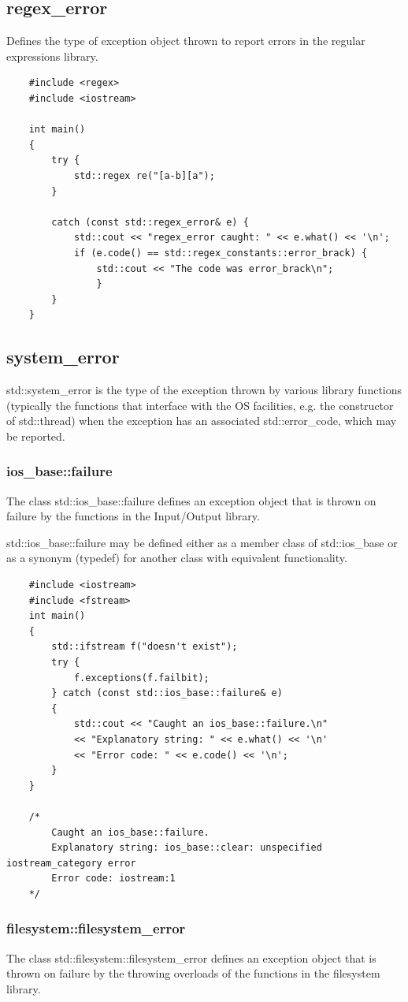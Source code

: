 \documentclass[UTF8,a4paper,12pt]{ctexbook}
\begin{document}
		\subsection{regex\_error}
			Defines the type of exception object thrown to report errors in the regular expressions library. 
\begin{lstlisting}
	#include <regex>
	#include <iostream>
				
	int main()
	{
		try {
			std::regex re("[a-b][a");
		} 
					
		catch (const std::regex_error& e) {
			std::cout << "regex_error caught: " << e.what() << '\n';
			if (e.code() == std::regex_constants::error_brack) {
				std::cout << "The code was error_brack\n";
				}
		}
	}
\end{lstlisting}
		\subsection{system\_error}
			std::system\_error is the type of the exception thrown by various library functions (typically the functions that interface with the OS facilities, e.g. the constructor of std::thread) when the exception has an associated std::error\_code, which may be reported. 
			\subsubsection{ios\_base::failure}
				The class std::ios\_base::failure defines an exception object that is thrown on failure by the functions in the Input/Output library.
				
				std::ios\_base::failure may be defined either as a member class of std::ios\_base or as a synonym (typedef) for another class with equivalent functionality. 
				
\begin{lstlisting}
	#include <iostream>
	#include <fstream>
	int main()
	{
		std::ifstream f("doesn't exist");
		try {
			f.exceptions(f.failbit);
		} catch (const std::ios_base::failure& e)
		{
			std::cout << "Caught an ios_base::failure.\n"
			<< "Explanatory string: " << e.what() << '\n'
			<< "Error code: " << e.code() << '\n';
		}
	}
					
	/*
		Caught an ios_base::failure.
		Explanatory string: ios_base::clear: unspecified iostream_category error
		Error code: iostream:1
	*/
				\end{lstlisting}
			\subsubsection{filesystem::filesystem\_error}
				The class std::filesystem::filesystem\_error defines an exception object that is thrown on failure by the throwing overloads of the functions in the filesystem library. 
				
\end{document}
